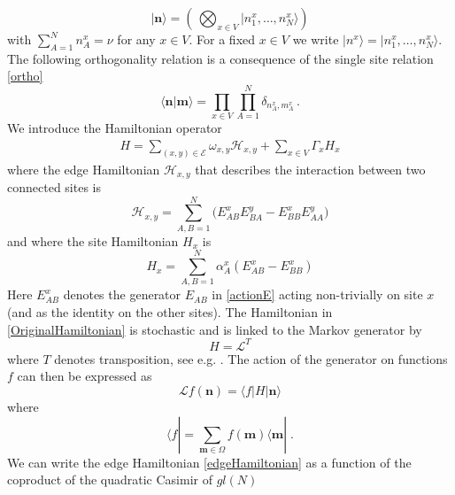 \documentclass[10pt]{article}
\numberwithin{equation}{section}
\numberwithin{equation}{subsection}
\newcommand{\dt}{\;.}
\begin{document}
\begin{equation}
|{\bm{n}}\rangle=\left(\,\bigotimes_{x\in V}	|n_{1}^{x},\ldots,n_{N}^{x}\rangle\right)
\end{equation}
with $\sum_{A=1}^{N}n_{A}^{x}=\nu$ for any $x\in V$. For a fixed $x\in V$ we write $|n^{x}\rangle=|n_{1}^{x},\ldots,n_{N}^{x}\rangle$. The following orthogonality relation is a consequence of the single site relation \eqref{ortho}
\begin{equation}
    \langle {\bm{n}}|{\bm{m}}\rangle =\prod_{x\in V}\prod_{A=1}^N\delta_{n^x_{A},m^{x}_{A}}\,.
\end{equation}
We introduce the Hamiltonian operator
\begin{equation}\label{OriginalHamiltonian}
	\begin{split}
		H=\sum_{(x,y)\in \mathcal{E}}\omega_{x,y}\mathcal{H}_{x,y}+\sum_{x\in V}\Gamma_{x}H_{x}
	\end{split}
\end{equation}
where the edge Hamiltonian $\mathcal{H}_{x,y}$ that describes the interaction between two connected sites is
\begin{equation}\label{edgeHamiltonian}
\mathcal{H}_{x,y}=\sum_{A,B=1}^{N}\Big(E_{AB}^{x} E_{BA}^{y}-E_{BB}^{x} E_{AA}^{y}\Big)
 \end{equation}
  and where the site Hamiltonian $H_{x}$  is
 \begin{equation}\label{siteHamiltonian}
H_{x}=\sum_{A,B=1}^{N}\alpha_{A}^{x}\left(E_{AB}^{x}-E_{BB}^{x}\right)
\end{equation}
Here $E_{AB}^{x}$ denotes the generator $E_{AB}$ in \eqref{actionE} acting non-trivially on site $x$ (and as the identity on the other sites). 
The Hamiltonian in \eqref{OriginalHamiltonian} is stochastic and is linked to the Markov generator  by
\begin{equation}\label{Hamiltonian-Generator}
H=\mathcal{L}^{T} 
\end{equation}
where $T$ denotes transposition, see e.g.  \cite{belitsky2015self}.
The action of the generator on functions $f$ can then  be expressed as 
\begin{equation}
    \mathcal{L}f( {\bm{n}})=\langle f|H| {\bm{n}}\rangle
\end{equation}
where 
\begin{equation}
    \langle f|=\sum_{ {{\bm{m}}\in \Omega}}f( {\bm{m}})\langle  {\bm{m}}|\dt
\end{equation}
We can write the edge Hamiltonian \eqref{edgeHamiltonian} as a function of the coproduct of the quadratic Casimir of ${gl}(N)$
\end{document}
